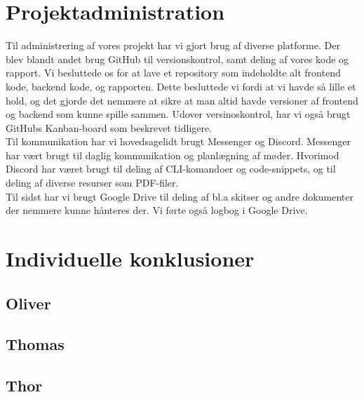 \documentclass{article}
\begin{document}
\section{Projektadministration}
Til administrering af vores projekt har vi gjort brug af diverse platforme.
Der blev blandt andet brug GitHub til versionskontrol, samt deling af vores kode og rapport.
Vi besluttede os for at lave et repository som indeholdte alt frontend kode, backend kode, og rapporten. 
Dette besluttede vi fordi at vi havde så lille et hold, og det gjorde det nemmere at sikre at man altid havde versioner af frontend og backend som kunne spille sammen.
Udover versinoskontrol, har vi også brugt GitHubs Kanban-board som beskrevet tidligere.
\\
Til kommunikation har vi hovedsagelidt brugt Messenger og Discord. 
Messenger har vært brugt til daglig kommunikation og planlægning af møder. 
Hvorimod Discord har været brugt til deling af CLI-komandoer og code-snippets, og til deling af diverse resurser som PDF-filer.
\\
Til sidst har vi brugt Google Drive til deling af bl.a skitser og andre dokumenter der nemmere kunne hånteres der.
Vi førte også logbog i Google Drive.

\section{Individuelle konklusioner}

\subsection{Oliver}

\subsection{Thomas}

\subsection{Thor}
\end{document}
